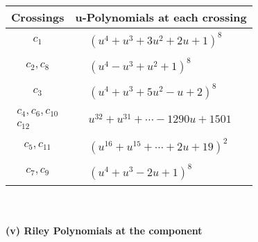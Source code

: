 \documentclass[1p]{elsarticle_modified}
\theoremstyle{definition}
\begin{document}
\begin{tabular}{m{50pt}|m{274pt}}
Crossings & \hspace{64pt}u-Polynomials at each crossing \\
\hline $$\begin{aligned}c_{1}\end{aligned}$$&$\begin{aligned}
&(u^4+u^3+3 u^2+2 u+1)^8
\end{aligned}$\\
\hline $$\begin{aligned}c_{2},c_{8}\end{aligned}$$&$\begin{aligned}
&(u^4- u^3+u^2+1)^8
\end{aligned}$\\
\hline $$\begin{aligned}c_{3}\end{aligned}$$&$\begin{aligned}
&(u^4+u^3+5 u^2- u+2)^8
\end{aligned}$\\
\hline $$\begin{aligned}c_{4},c_{6},c_{10}\\c_{12}\end{aligned}$$&$\begin{aligned}
&u^{32}+u^{31}+\cdots-1290 u+1501
\end{aligned}$\\
\hline $$\begin{aligned}c_{5},c_{11}\end{aligned}$$&$\begin{aligned}
&(u^{16}+u^{15}+\cdots+2 u+19)^{2}
\end{aligned}$\\
\hline $$\begin{aligned}c_{7},c_{9}\end{aligned}$$&$\begin{aligned}
&(u^4+u^3-2 u+1)^8
\end{aligned}$\\
\hline
\end{tabular}\\~\\
\newpage\renewcommand{\arraystretch}{1}
\flushleft \textbf{(v) Riley Polynomials at the component}\newline \\
\end{document}
